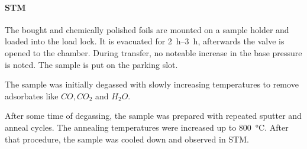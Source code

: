 \paragraph{STM}
The bought and chemically polished foils are mounted on a sample holder and loaded into the load lock. It is evacuated for \SIrange{2}{3}{\hour}, afterwards the valve is opened to the chamber. During transfer, no noteable increase in the base pressure is noted. The sample is put on the parking slot.

The sample was initially degassed with slowly increasing temperatures to remove adsorbates like $CO, CO_2$ and $H_2O$.

After some time of degassing, the sample was prepared with repeated sputter and anneal cycles. The annealing temperatures were increased up to \SI{800}{\degreeCelsius}. 
After that procedure, the sample was cooled down and observed in STM.
